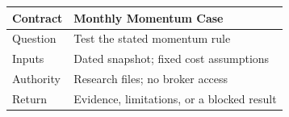 \begin{tabular}{@{}P{4.0cm}P{8.5cm}@{}}
\toprule
\textbf{Contract} & \textbf{Monthly Momentum Case} \\
\midrule
Question & Test the stated momentum rule \\
Inputs & Dated snapshot; fixed cost assumptions \\
Authority & Research files; no broker access \\
Return & Evidence, limitations, or a blocked result \\
\bottomrule
\end{tabular}

